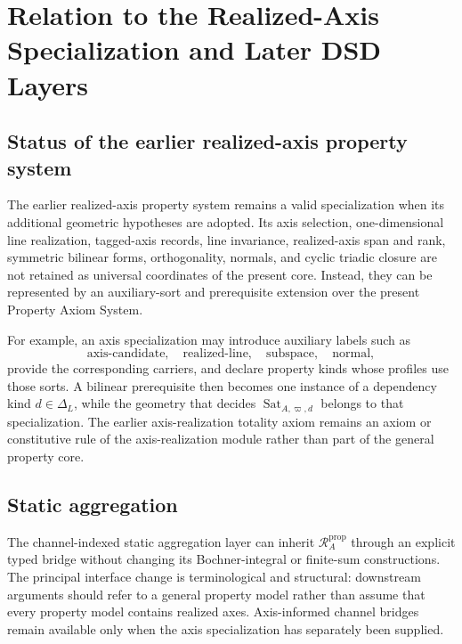 \documentclass[11pt]{article}
\newcommand{\Dep}{\Delta_{L}}
\newcommand{\Sat}{\operatorname{Sat}}
\newcommand{\PropRec}{\mathcal R^{\mathrm{prop}}}
\theoremstyle{definition}
\theoremstyle{remark}
\begin{document}
\section{Relation to the Realized-Axis Specialization and Later DSD Layers}
\label{sec:specialization}

\subsection{Status of the earlier realized-axis property system}

The earlier realized-axis property system \cite{KwonAxisProperty} remains a valid specialization when its additional geometric hypotheses are adopted.
Its axis selection, one-dimensional line realization, tagged-axis records, line invariance, realized-axis span and rank, symmetric bilinear forms, orthogonality, normals, and cyclic triadic closure are not retained as universal coordinates of the present core.
Instead, they can be represented by an auxiliary-sort and prerequisite extension over the present Property Axiom System.

For example, an axis specialization may introduce auxiliary labels such as
\[
\mathrm{axis\mbox{-}candidate},\quad
\mathrm{realized\mbox{-}line},\quad
\mathrm{subspace},\quad
\mathrm{normal},
\]
provide the corresponding carriers, and declare property kinds whose profiles use those sorts.
A bilinear prerequisite then becomes one instance of a dependency kind \(d\in\Dep\), while the geometry that decides \(\Sat_{A,\varpi,d}\) belongs to that specialization.
The earlier axis-realization totality axiom remains an axiom or constitutive rule of the axis-realization module rather than part of the general property core.

\subsection{Static aggregation}

The channel-indexed static aggregation layer can inherit \(\PropRec_A\) through an explicit typed bridge without changing its Bochner-integral or finite-sum constructions.
The principal interface change is terminological and structural: downstream arguments should refer to a general property model rather than assume that every property model contains realized axes.
Axis-informed channel bridges remain available only when the axis specialization has separately been supplied.
\end{document}
